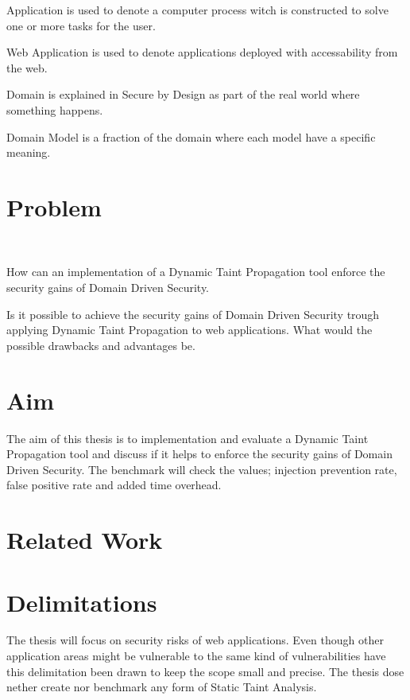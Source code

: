 \begin{definition}{Application} 
	is used to denote a computer process witch is constructed to solve one or more tasks for the user.
\end{definition}

\begin{definition}{Web Application} 
	is used to denote applications deployed with accessability from the web.
\end{definition}

\begin{definition}{Domain}
	is explained in Secure by Design \parencite{sbd2018} as part of the real world where something happens.
\end{definition}

\begin{definition}{Domain Model}
	is a fraction of the domain where each model have a specific meaning.
\end{definition}


\section{Problem}
\hfill \\
\begin{chapquote}{}
	How can an implementation of a Dynamic Taint Propagation tool enforce the security gains of Domain Driven Security.
\end{chapquote}

\noindent
Is it possible to achieve the security gains of Domain Driven Security trough applying Dynamic Taint Propagation to web applications. What would the possible drawbacks and advantages be.


\section{Aim}
The aim of this thesis is to implementation and evaluate a Dynamic Taint Propagation tool and discuss if it helps to enforce the security gains of Domain Driven Security. The benchmark will check the values; injection prevention rate, false positive rate and added time overhead. 


\section{Related Work}


\section{Delimitations}
The thesis will focus on security risks of web applications. Even though other application areas might be vulnerable to the same kind of vulnerabilities have this delimitation been drawn to keep the scope small and precise. The thesis dose nether create nor benchmark any form of Static Taint Analysis. 

